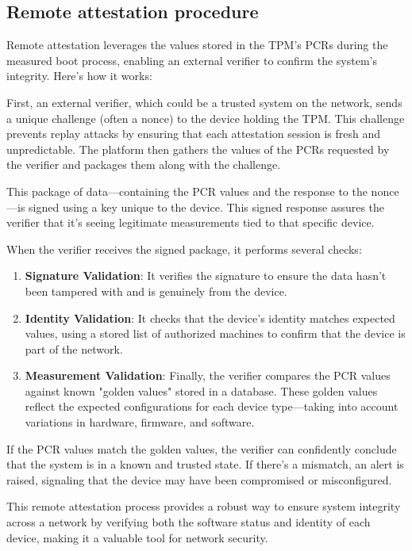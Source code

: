 \subsection{Remote attestation procedure}

Remote attestation leverages the values stored in the TPM’s PCRs
during the measured boot process, enabling an external verifier to
confirm the system's integrity. Here’s how it works:

First, an external verifier, which could be a trusted system on the
network, sends a unique challenge (often a nonce) to the device
holding the TPM. This challenge prevents replay attacks by ensuring
that each attestation session is fresh and unpredictable. The platform
then gathers the values of the PCRs requested by the verifier and
packages them along with the challenge.

This package of data—containing the PCR values and the response to the
nonce—is signed using a key unique to the device. This signed response
assures the verifier that it’s seeing legitimate measurements tied to
that specific device.

When the verifier receives the signed package, it performs several
checks:
\begin{enumerate}
  \item \textbf{Signature Validation}: It verifies the signature to
    ensure the data hasn’t been tampered with and is genuinely from the
    device.
  \item \textbf{Identity Validation}: It checks that the device’s
    identity matches expected values, using a stored list of authorized
    machines to confirm that the device is part of the network.
  \item \textbf{Measurement Validation}: Finally, the verifier compares
    the PCR values against known "golden values" stored in a database.
    These golden values reflect the expected configurations for each
    device type—taking into account variations in hardware, firmware,
    and software.
\end{enumerate}

If the PCR values match the golden values, the verifier can
confidently conclude that the system is in a known and trusted state.
If there’s a mismatch, an alert is raised, signaling that the device
may have been compromised or misconfigured.

This remote attestation process provides a robust way to ensure system
integrity across a network by verifying both the software status and
identity of each device, making it a valuable tool for network
security.

